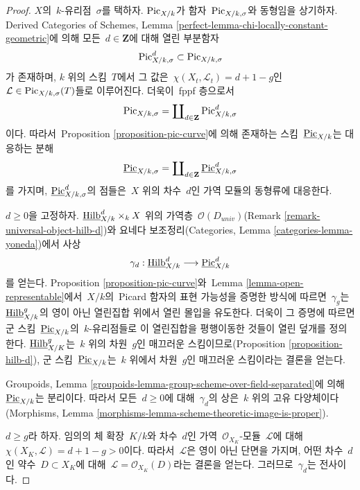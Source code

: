 \begin{proof}
$X$의\  $k$-유리점\  $\sigma$를 택하자. $\mathrm{Pic}_{X/k}$가 함자\ 
$\mathrm{Pic}_{X/k, \sigma}$와 동형임을 상기하자. Derived Categories of
Schemes, Lemma \ref{perfect-lemma-chi-locally-constant-geometric}에 의해 모든\ 
$d \in \mathbf{Z}$에 대해 열린 부분함자
$$
\mathrm{Pic}^d_{X/k, \sigma} \subset \mathrm{Pic}_{X/k, \sigma}
$$
가 존재하며, $k$ 위의 스킴\  $T$에서 그 값은\ 
$\chi(X_t, \mathcal{L}_t) = d + 1 - g$인\ 
$\mathcal{L} \in \mathrm{Pic}_{X/k, \sigma}(T)$들로 이루어진다. 더욱이\ 
fppf 층으로서
$$
\mathrm{Pic}_{X/k, \sigma} =
\coprod\nolimits_{d \in \mathbf{Z}} \mathrm{Pic}^d_{X/k, \sigma}
$$
이다. 따라서\  Proposition \ref{proposition-pic-curve}에 의해 존재하는 스킴\ 
$\underline{\mathrm{Pic}}_{X/k}$는 대응하는 분해
$$
\underline{\mathrm{Pic}}_{X/k, \sigma} =
\coprod\nolimits_{d \in \mathbf{Z}} \underline{\mathrm{Pic}}^d_{X/k, \sigma}
$$
를 가지며, $\underline{\mathrm{Pic}}^d_{X/k, \sigma}$의 점들은\  $X$ 위의
차수\  $d$인 가역 모듈의 동형류에 대응한다.

\medskip\noindent
$d \geq 0$을 고정하자.
$\underline{\mathrm{Hilb}}^d_{X/k} \times_k X$ 위의 가역층\ 
$\mathcal{O}(D_{univ})$(Remark \ref{remark-universal-object-hilb-d})와
요네다 보조정리(Categories, Lemma \ref{categories-lemma-yoneda})에서 사상
$$
\gamma_d :
\underline{\mathrm{Hilb}}^d_{X/k}
\longrightarrow
\underline{\mathrm{Pic}}^d_{X/k}
$$
를 얻는다. Proposition \ref{proposition-pic-curve}와\  Lemma
\ref{lemma-open-representable}에서\  $X/k$의\  Picard 함자의 표현 가능성을
증명한 방식에 따르면\  $\gamma_g$는\ 
$\underline{\mathrm{Hilb}}^g_{X/k}$의 영이 아닌 열린집합 위에서 열린 몰입을
유도한다. 더욱이 그 증명에 따르면 군 스킴\ 
$\underline{\mathrm{Pic}}_{X/k}$의\  $k$-유리점들로 이 열린집합을 평행이동한
것들이 열린 덮개를 정의한다. $\underline{\mathrm{Hilb}}^g_{X/K}$는\  $k$ 위의
차원\  $g$인 매끄러운 스킴이므로(Proposition \ref{proposition-hilb-d}),
군 스킴\  $\underline{\mathrm{Pic}}_{X/k}$는\  $k$ 위에서 차원\  $g$인
매끄러운 스킴이라는 결론을 얻는다.

\medskip\noindent
Groupoids, Lemma \ref{groupoids-lemma-group-scheme-over-field-separated}에 의해\ 
$\underline{\mathrm{Pic}}_{X/k}$는 분리이다. 따라서 모든\  $d \geq 0$에
대해\  $\gamma_d$의 상은\  $k$ 위의 고유 다양체이다
(Morphisms, Lemma \ref{morphisms-lemma-scheme-theoretic-image-is-proper}).

\medskip\noindent
$d \geq g$라 하자. 임의의 체 확장\  $K/k$와 차수\  $d$인 가역\ 
$\mathcal{O}_{X_K}$-모듈\  $\mathcal{L}$에 대해\ 
$\chi(X_K, \mathcal{L}) = d + 1 - g > 0$이다. 따라서\  $\mathcal{L}$은 영이
아닌 단면을 가지며, 어떤 차수\  $d$인 약수\  $D \subset X_K$에 대해\ 
$\mathcal{L} = \mathcal{O}_{X_K}(D)$라는 결론을 얻는다. 그러므로\ 
$\gamma_d$는 전사이다.


\end{proof}

